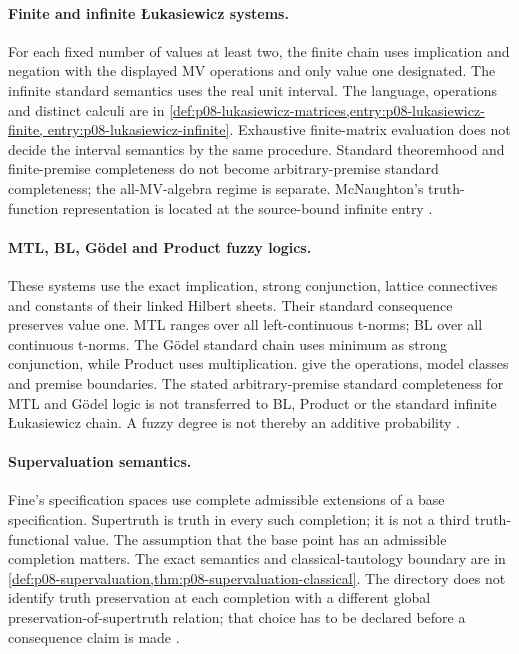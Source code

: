 \paragraph{Finite and infinite \L{}ukasiewicz systems.}
\label{entry:p14-directory-lukasiewicz}
For each fixed number of values at least two, the finite chain uses
implication and negation with the displayed MV operations and only value
one designated. The infinite standard semantics uses the real unit
interval. The language, operations and distinct calculi are in
\cref{def:p08-lukasiewicz-matrices,entry:p08-lukasiewicz-finite,
entry:p08-lukasiewicz-infinite}. Exhaustive finite-matrix evaluation
does not decide the interval semantics by the same procedure. Standard
theoremhood and finite-premise completeness do not become arbitrary-premise
standard completeness; the all-MV-algebra regime is separate. McNaughton's
truth-function representation is located at the source-bound infinite
entry \cite{Lukasiewicz1920,LukasiewiczTarski1930,McNaughton1951,
Hajek1998,CignoliDOttavianoMundici2000}.

\paragraph{MTL, BL, G\"odel and Product fuzzy logics.}
\label{entry:p14-directory-fuzzy}
These systems use the exact implication, strong conjunction, lattice
connectives and constants of their linked Hilbert sheets. Their standard
consequence preserves value one. MTL ranges over all left-continuous
t-norms; BL over all continuous t-norms. The G\"odel standard chain uses
minimum as strong conjunction, while Product uses multiplication.
 give the operations, model classes and
premise boundaries. The stated arbitrary-premise standard completeness
for MTL and G\"odel logic is not transferred to BL, Product or the
standard infinite \L{}ukasiewicz chain. A fuzzy degree is not thereby
an additive probability \cite{Hajek1998,EstevaGodo2001,JeneiMontagna2002,
CignoliEstevaGodoTorrens2000,CintulaHajekNoguera2011}.

\paragraph{Supervaluation semantics.}
\label{entry:p14-directory-supervaluation}
Fine's specification spaces use complete admissible extensions of a
base specification. Supertruth is truth in every such completion; it
is not a third truth-functional value. The assumption that the base
point has an admissible completion matters. The exact semantics and
classical-tautology boundary are in
\cref{def:p08-supervaluation,thm:p08-supervaluation-classical}.
The directory does not identify truth preservation at each completion
with a different global preservation-of-supertruth relation; that
choice has to be declared before a consequence claim is made \cite{Fine1975}.

